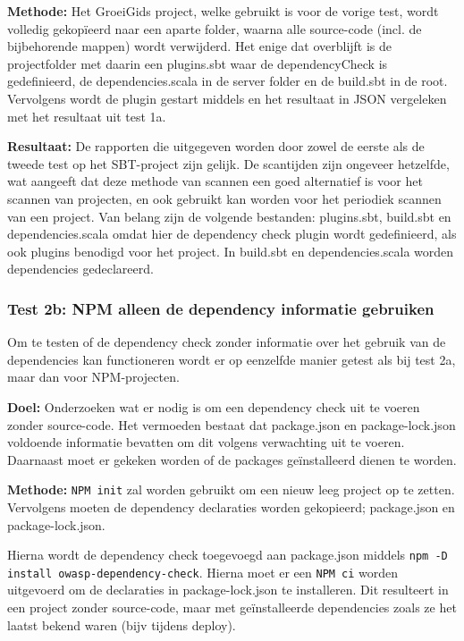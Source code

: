 \textbf{Methode:} Het GroeiGids project, welke gebruikt is voor de vorige test, wordt volledig gekopïeerd naar een aparte folder, waarna alle source-code (incl. de bijbehorende mappen) wordt verwijderd. Het enige dat overblijft is de projectfolder met daarin een plugins.sbt waar de dependencyCheck is gedefinieerd, de dependencies.scala in de server folder en de build.sbt in de root. Vervolgens wordt de plugin gestart middels  en het resultaat in JSON vergeleken met het resultaat uit test 1a.

\textbf{Resultaat:} De rapporten die uitgegeven worden door zowel de eerste als de tweede test op het SBT-project zijn gelijk. De scantijden zijn ongeveer hetzelfde, wat aangeeft dat deze methode van scannen een goed alternatief is voor het scannen van projecten, en ook gebruikt kan worden voor het periodiek scannen van een project. Van belang zijn de volgende bestanden: plugins.sbt, build.sbt en dependencies.scala omdat hier de dependency check plugin wordt gedefinieerd, als ook plugins benodigd voor het project. In build.sbt en dependencies.scala worden dependencies gedeclareerd.

\subsubsection{Test 2b: NPM alleen de dependency informatie gebruiken}
Om te testen of de dependency check zonder informatie over het gebruik van de dependencies kan functioneren wordt er op eenzelfde manier getest als bij test 2a, maar dan voor NPM-projecten.

\textbf{Doel:} Onderzoeken wat er nodig is om een dependency check uit te voeren zonder source-code. Het vermoeden bestaat dat package.json en package-lock.json voldoende informatie bevatten om dit volgens verwachting uit te voeren. Daarnaast moet er gekeken worden of de packages geïnstalleerd dienen te worden.

\textbf{Methode:}
\texttt{NPM init} zal worden gebruikt om een nieuw leeg project op te zetten. Vervolgens moeten de dependency declaraties worden gekopieerd; package.json en package-lock.json.

Hierna wordt de dependency check toegevoegd aan package.json middels \texttt{npm -D install owasp-dependency-check}. Hierna moet er een \texttt{NPM ci} worden uitgevoerd om de declaraties in package-lock.json te installeren. Dit resulteert in een project zonder source-code, maar met geïnstalleerde dependencies zoals ze het laatst bekend waren (bijv tijdens deploy).

